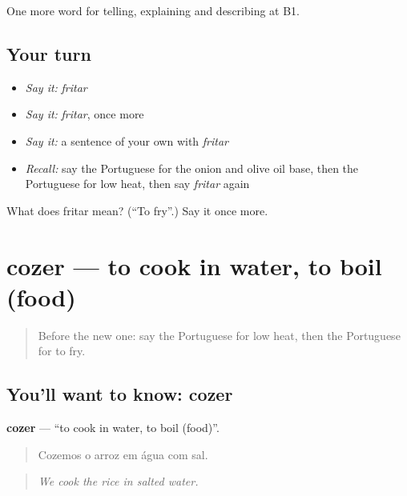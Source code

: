 \begin{grammarlens}[title={What you've built}]
One more word for telling, explaining and describing at B1.
\end{grammarlens}

\subsection*{Your turn}
\begin{itemize}
\raggedright
  \item \emph{Say it:} \emph{fritar}
  \item \emph{Say it:} \emph{fritar}, once more
  \item \emph{Say it:} a sentence of your own with \emph{fritar}
  \item \emph{Recall:} say the Portuguese for the onion and olive oil base, then the Portuguese for low heat, then say \emph{fritar} again
\end{itemize}

\begin{tcolorbox}[breakable,colback=teal!4,colframe=teal!35!black,title={Before you move on}]
What does fritar mean? (\textquotedblleft{}To fry\textquotedblright{}.) Say it once more.
\end{tcolorbox}
\section[cozer]{cozer — to cook in water, to boil (food)}

\label{lesson:PT-C332-cozer}



\begin{quote}
Before the new one: say the Portuguese for low heat, then the Portuguese for to fry.
\end{quote}

\subsection*{You'll want to know: cozer}
\textbf{cozer} — \textquotedblleft{}to cook in water, to boil (food)\textquotedblright{}.

\begin{quote}
Cozemos o arroz em água com sal.
\end{quote}

\begin{quote}
\emph{We cook the rice in salted water.}
\end{quote}

